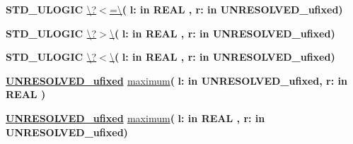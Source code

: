 \begin{DoxyCompactItemize}
\item 
{\bfseries {\bfseries \textcolor{comment}{S\+T\+D\+\_\+\+U\+L\+O\+G\+I\+C}\textcolor{vhdlchar}{ }}} \hyperlink{classfixed__pkg_a271da29f659a2bc9480dbd29d7727913}{\textbackslash{}?$<$=\textbackslash{}}{\bfseries  ( }{\bfseries \textcolor{vhdlchar}{l\+: }\textcolor{stringliteral}{in }{\bfseries \textcolor{comment}{R\+E\+A\+L}\textcolor{vhdlchar}{ }}}{\bfseries  , \textcolor{vhdlchar}{r\+: }\textcolor{stringliteral}{in }\textcolor{vhdlchar}{U\+N\+R\+E\+S\+O\+L\+V\+E\+D\+\_\+ufixed}}{\bfseries  )} 
\item 
{\bfseries {\bfseries \textcolor{comment}{S\+T\+D\+\_\+\+U\+L\+O\+G\+I\+C}\textcolor{vhdlchar}{ }}} \hyperlink{classfixed__pkg_a9e6b6b8c2c14da978e6f70cb6e85e6dc}{\textbackslash{}?$>$\textbackslash{}}{\bfseries  ( }{\bfseries \textcolor{vhdlchar}{l\+: }\textcolor{stringliteral}{in }{\bfseries \textcolor{comment}{R\+E\+A\+L}\textcolor{vhdlchar}{ }}}{\bfseries  , \textcolor{vhdlchar}{r\+: }\textcolor{stringliteral}{in }\textcolor{vhdlchar}{U\+N\+R\+E\+S\+O\+L\+V\+E\+D\+\_\+ufixed}}{\bfseries  )} 
\item 
{\bfseries {\bfseries \textcolor{comment}{S\+T\+D\+\_\+\+U\+L\+O\+G\+I\+C}\textcolor{vhdlchar}{ }}} \hyperlink{classfixed__pkg_a7e98e66a4a282c529968f69f70dd16ad}{\textbackslash{}?$<$\textbackslash{}}{\bfseries  ( }{\bfseries \textcolor{vhdlchar}{l\+: }\textcolor{stringliteral}{in }{\bfseries \textcolor{comment}{R\+E\+A\+L}\textcolor{vhdlchar}{ }}}{\bfseries  , \textcolor{vhdlchar}{r\+: }\textcolor{stringliteral}{in }\textcolor{vhdlchar}{U\+N\+R\+E\+S\+O\+L\+V\+E\+D\+\_\+ufixed}}{\bfseries  )} 
\item 
{\bfseries {\bfseries {\bfseries \hyperlink{classfixed__pkg_ae78bc2b36d22f6abeac163955e8a587d}{U\+N\+R\+E\+S\+O\+L\+V\+E\+D\+\_\+ufixed}} \textcolor{vhdlchar}{ }}} \hyperlink{classfixed__pkg_a8e1abbe4534fa7d5dea9fee275da3723}{maximum}{\bfseries  ( }{\bfseries \textcolor{vhdlchar}{l\+: }\textcolor{stringliteral}{in }\textcolor{vhdlchar}{U\+N\+R\+E\+S\+O\+L\+V\+E\+D\+\_\+ufixed}}{\bfseries  , \textcolor{vhdlchar}{r\+: }\textcolor{stringliteral}{in }{\bfseries \textcolor{comment}{R\+E\+A\+L}\textcolor{vhdlchar}{ }}}{\bfseries  )} 
\item 
{\bfseries {\bfseries {\bfseries \hyperlink{classfixed__pkg_ae78bc2b36d22f6abeac163955e8a587d}{U\+N\+R\+E\+S\+O\+L\+V\+E\+D\+\_\+ufixed}} \textcolor{vhdlchar}{ }}} \hyperlink{classfixed__pkg_a8e1abbe4534fa7d5dea9fee275da3723}{maximum}{\bfseries  ( }{\bfseries \textcolor{vhdlchar}{l\+: }\textcolor{stringliteral}{in }{\bfseries \textcolor{comment}{R\+E\+A\+L}\textcolor{vhdlchar}{ }}}{\bfseries  , \textcolor{vhdlchar}{r\+: }\textcolor{stringliteral}{in }\textcolor{vhdlchar}{U\+N\+R\+E\+S\+O\+L\+V\+E\+D\+\_\+ufixed}}{\bfseries  )} 

\end{DoxyCompactItemize}
